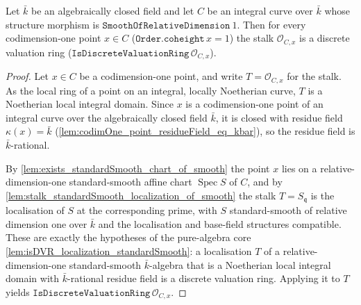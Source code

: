 \begin{lemma}

  \label{lem:stalk_isDVR_of_smooth}
  Let \(\bar k\) be an algebraically closed field and let \(C\) be an
  integral curve over \(\bar k\) whose structure morphism is
  \(\texttt{SmoothOfRelativeDimension}\ 1\). Then for every codimension-one
  point \(x \in C\) (\(\texttt{Order.coheight}\,x = 1\)) the stalk
  \(\mathcal O_{C, x}\) is a discrete valuation ring
  (\(\texttt{IsDiscreteValuationRing}\,\mathcal O_{C, x}\)).
\end{lemma}

\begin{proof}
  Let \(x \in C\) be a codimension-one point, and write
  \(T = \mathcal O_{C, x}\) for the stalk. As the local ring of a point on an
  integral, locally Noetherian curve, \(T\) is a Noetherian local integral
  domain. Since \(x\) is a codimension-one point of an integral curve over the
  algebraically closed field \(\bar k\), it is closed with residue field
  \(\kappa(x) = \bar k\) (\cref{lem:codimOne_point_residueField_eq_kbar}), so the
  residue field is \(\bar k\)-rational.

  By \cref{lem:exists_standardSmooth_chart_of_smooth} the point \(x\) lies on a
  relative-dimension-one standard-smooth affine chart
  \(\operatorname{Spec} S\) of \(C\), and by
  \cref{lem:stalk_standardSmooth_localization_of_smooth} the stalk
  \(T = S_{\mathfrak q}\) is the localisation of \(S\) at the corresponding
  prime, with \(S\) standard-smooth of relative dimension one over \(\bar k\)
  and the localisation and base-field structures compatible. These are exactly
  the hypotheses of the pure-algebra core
  \cref{lem:isDVR_localization_standardSmooth}: a localisation \(T\) of a
  relative-dimension-one standard-smooth \(\bar k\)-algebra that is a Noetherian
  local integral domain with \(\bar k\)-rational residue field is a discrete
  valuation ring. Applying it to \(T\) yields
  \(\texttt{IsDiscreteValuationRing}\,\mathcal O_{C, x}\).
\end{proof}

